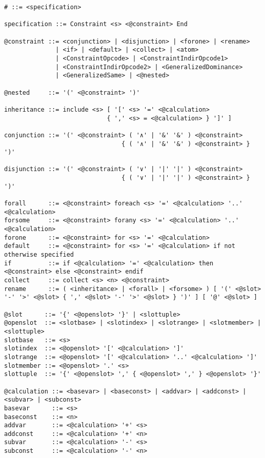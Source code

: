\begin{lstlisting}[language={},basicstyle=\small\ttfamily,
                   numbers=none,framexleftmargin=0pt,xleftmargin=0pt,]
# ::= <specification>

specification ::= Constraint <s> <@constraint> End

@constraint ::= <conjunction> | <disjunction> | <forone> | <rename>
              | <if> | <default> | <collect> | <atom>
              | <ConstraintOpcode> | <ConstraintIndirOpcode1>
              | <ConstraintIndirOpcode2> | <GeneralizedDominance>
              | <GeneralizedSame> | <@nested>

@nested     ::= '(' <@constraint> ')'

inheritance ::= include <s> [ '[' <s> '=' <@calculation>
                            { ',' <s> = <@calculation> } ']' ]

conjunction ::= '(' <@constraint> ( '∧' | '&' '&' ) <@constraint>
                                { ( '∧' | '&' '&' ) <@constraint> } ')'

disjunction ::= '(' <@constraint> ( '∨' | '|' '|' ) <@constraint>
                                { ( '∨' | '|' '|' ) <@constraint> } ')'

forall      ::= <@constraint> foreach <s> '=' <@calculation> '..' <@calculation>
forsome     ::= <@constraint> forany <s> '=' <@calculation> '..' <@calculation>
forone      ::= <@constraint> for <s> '=' <@calculation>
default     ::= <@constraint> for <s> '=' <@calculation> if not otherwise specified
if          ::= if <@calculation> '=' <@calculation> then <@constraint> else <@constraint> endif
collect     ::= collect <s> <n> <@constraint>
rename      ::= ( <inheritance> | <forall> | <forsome> ) [ '(' <@slot> '-' '>' <@slot> { ',' <@slot> '-' '>' <@slot> } ')' ] [ '@' <@slot> ]

@slot      ::= '{' <@openslot> '}' | <slottuple>
@openslot  ::= <slotbase> | <slotindex> | <slotrange> | <slotmember> | <slottuple>
slotbase   ::= <s>
slotindex  ::= <@openslot> '[' <@calculation> ']'
slotrange  ::= <@openslot> '[' <@calculation> '..' <@calculation> ']'
slotmember ::= <@openslot> '.' <s>
slottuple  ::= '{' <@openslot> ',' { <@openslot> ',' } <@openslot> '}'

@calculation ::= <basevar> | <baseconst> | <addvar> | <addconst> | <subvar> | <subconst>
basevar      ::= <s>
baseconst    ::= <n>
addvar       ::= <@calculation> '+' <s>
addconst     ::= <@calculation> '+' <n>
subvar       ::= <@calculation> '-' <s>
subconst     ::= <@calculation> '-' <n>


\end{lstlisting}

